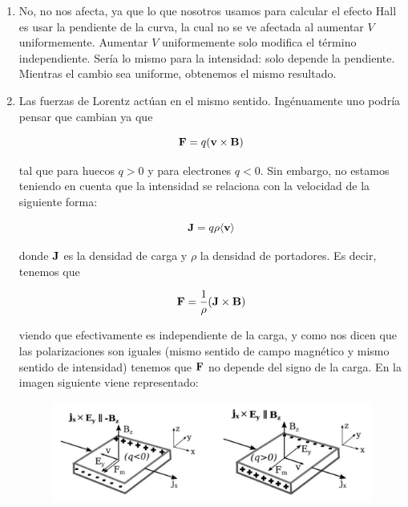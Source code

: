 \begin{enumerate}[label=\alph*)]
	\item No, no nos afecta, ya que lo que nosotros usamos para calcular el efecto Hall es usar la pendiente de la curva, la cual no se ve afectada al aumentar $V$ uniformemente. Aumentar $V$ uniformemente solo modifica el término independiente. Sería lo mismo para la intensidad: solo depende la pendiente. Mientras el cambio sea uniforme, obtenemos el mismo resultado. 

	\item Las fuerzas de Lorentz actúan en el mismo sentido. Ingénuamente uno podría pensar que cambian ya que

	      \[
		      \mathbf{F} = q (\mathbf{v} \times \mathbf{B})
	      \]

	      tal que para huecos $q>0$ y para electrones $q<0$. Sin embargo, no estamos teniendo en cuenta que la intensidad se relaciona con la velocidad de la siguiente forma:

	      \[
		      \mathbf{J} = q \rho \langle \mathbf{v} \rangle
	      \]

	      donde $\mathbf{J}$ es la densidad de carga y $\rho$ la densidad de portadores. Es decir, tenemos que

	      \[
		      \mathbf{F} = \frac{1}{\rho} (\mathbf{J} \times \mathbf{B})
	      \]

	      viendo que efectivamente es independiente de la carga, y como nos dicen que las polarizaciones son iguales (mismo sentido de campo magnético y mismo sentido de intensidad) tenemos que $\mathbf{F}$ no depende del signo de la carga. En la imagen siguiente viene representado:

	      \begin{figure}[H] \centering
		      \includegraphics[width=0.8\linewidth]{Cuerpo/Ch_02/Examen_24_6.png}
	      \end{figure}


\end{enumerate}
\vspace*{2em}

